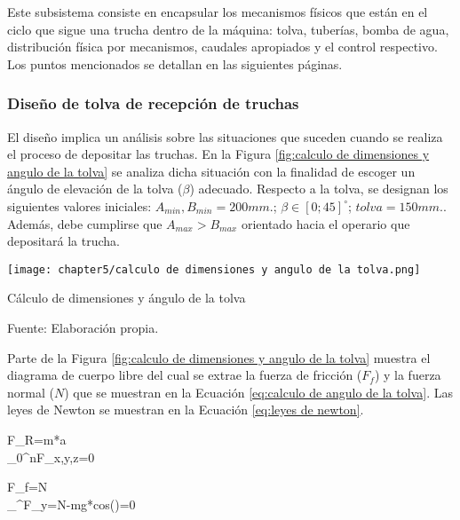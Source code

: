 Este subsistema consiste en encapsular los mecanismos físicos que están en el ciclo que sigue una trucha dentro de la máquina: tolva, tuberías, bomba de agua, distribución física por mecanismos, caudales apropiados y el control respectivo. Los puntos mencionados se detallan en las siguientes páginas.

\subsubsection{Diseño de tolva de recepción de truchas}

El diseño implica un análisis sobre las situaciones que suceden cuando se realiza el proceso de depositar las truchas. En la Figura \ref{fig:calculo de dimensiones y angulo de la tolva} se analiza dicha situación con la finalidad de escoger un ángulo de elevación de la tolva ($\beta$) adecuado. Respecto a la tolva, se designan los siguientes valores iniciales: $A_{min},B_{min}=200 mm.$; $\beta \in [0;45] ^\circ$; ${tolva}=150 mm.$. Además, debe cumplirse que $A_{max}>B_{max}$ orientado hacia el operario que depositará la trucha.

\begin{myfigure}[H]
	\centering
	\texttt{[image: chapter5/calculo de dimensiones y angulo de la tolva.png]}
	\caption{Cálculo de dimensiones y ángulo de la tolva}
	\begin{myflushleftportland}
		Fuente: Elaboración propia.
	\end{myflushleftportland}
	\label{fig:calculo de dimensiones y angulo de la tolva}
\end{myfigure}

Parte de la Figura \ref{fig:calculo de dimensiones y angulo de la tolva} muestra el diagrama de cuerpo libre del cual se extrae la fuerza de fricción ($F_{f}$) y la fuerza normal ($N$) que se muestran en la Ecuación \ref{eq:calculo de angulo de la tolva}. Las leyes de Newton se muestran en la Ecuación \ref{eq:leyes de newton}. 

\begin{myequation}\label{eq:leyes de newton}
	\begin{split}
		F_{R}=m*a \\
		\sum_{0}^{n}F_{x,y,z}=0
	\end{split}
\end{myequation}

\begin{myequation}\label{eq:calculo de angulo de la tolva}
	\begin{split}
		F_{f}=\mu*N  \\
		\sum_{}^{}F_{y}=N-mg*cos(\beta)=0
	\end{split}
\end{myequation}

